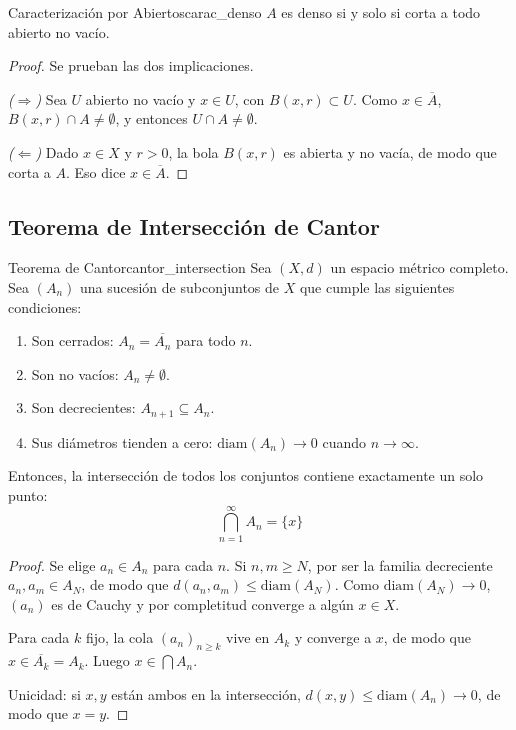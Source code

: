 \documentclass[11pt, a4paper]{article}
\begin{document}
\begin{proposicion}{Caracterización por Abiertos}{carac_denso}
$A$ es denso si y solo si corta a todo abierto no vacío.
\end{proposicion}

\begin{proof}
Se prueban las dos implicaciones.

\textit{($\Rightarrow$)} Sea $U$ abierto no vacío y $x \in U$, con $B(x, r) \subset U$. Como
$x \in \overline{A}$, $B(x, r) \cap A \ne \emptyset$, y entonces $U \cap A \ne \emptyset$.

\textit{($\Leftarrow$)} Dado $x \in X$ y $r > 0$, la bola $B(x, r)$ es abierta y no vacía, de modo que corta
a $A$. Eso dice $x \in \overline{A}$.
\end{proof}

\subsection{Teorema de Intersección de Cantor}

\begin{teorema}{Teorema de Cantor}{cantor_intersection}
Sea $(X, d)$ un espacio métrico completo. Sea $(A_n)$ una sucesión de subconjuntos de $X$ que cumple
las siguientes condiciones:
\begin{enumerate}
    \item Son cerrados: $A_n = \overline{A_n}$ para todo $n$.
    \item Son no vacíos: $A_n \neq \emptyset$.
    \item Son decrecientes: $A_{n+1} \subseteq A_n$.
    \item Sus diámetros tienden a cero: $\text{diam}(A_n) \to 0$ cuando $n \to \infty$.
\end{enumerate}
Entonces, la intersección de todos los conjuntos contiene exactamente un solo punto:
$$ \bigcap_{n=1}^{\infty} A_n = \{x\} $$
\end{teorema}

\begin{proof}
Se elige $a_n \in A_n$ para cada $n$. Si $n, m \ge N$, por ser la familia decreciente
$a_n, a_m \in A_N$, de modo que $d(a_n, a_m) \le \mathrm{diam}(A_N)$. Como $\mathrm{diam}(A_N) \to 0$,
$(a_n)$ es de Cauchy y por completitud converge a algún $x \in X$.

Para cada $k$ fijo, la cola $(a_n)_{n \ge k}$ vive en $A_k$ y converge a $x$, de modo que
$x \in \overline{A_k} = A_k$. Luego $x \in \bigcap A_n$.

Unicidad: si $x, y$ están ambos en la intersección, $d(x, y) \le \mathrm{diam}(A_n) \to 0$,
de modo que $x = y$.
\end{proof}
\end{document}
